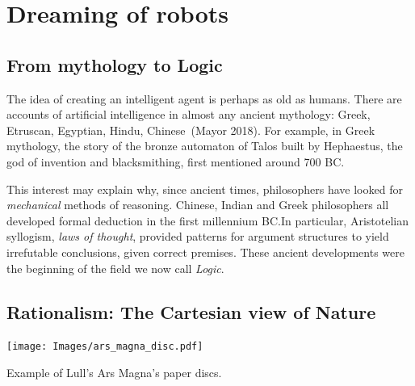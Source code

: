 \documentclass[
  letterpaper,
  12pt,
  british]{tufte-book}
\theoremstyle{plain}
\theoremstyle{plain}
\theoremstyle{definition}
\theoremstyle{remark}
\begin{document}
\hypertarget{dreaming-of-robots}{%
\section{Dreaming of robots}\label{dreaming-of-robots}}

\hypertarget{from-mythology-to-logic}{%
\subsection{From mythology to Logic}\label{from-mythology-to-logic}}

The idea of creating an intelligent agent is perhaps as old as humans.
There are accounts of artificial intelligence in almost any ancient
mythology: Greek, Etruscan, Egyptian, Hindu, Chinese~(Mayor
2018).
For example, in Greek mythology, the story of the bronze automaton of
Talos built by Hephaestus, the god of invention and blacksmithing, first
mentioned around 700 BC.

This interest may explain why, since ancient times, philosophers have
looked for \emph{mechanical} methods of reasoning. Chinese, Indian and
Greek philosophers all developed formal deduction in the first
millennium BC.In particular, Aristotelian syllogism, \emph{laws of
thought}, provided patterns for argument structures to yield irrefutable
conclusions, given correct premises. These ancient developments were the
beginning of the field we now call \emph{Logic}.

\hypertarget{sec-rationalism}{%
\subsection{Rationalism: The Cartesian view of
Nature}\label{sec-rationalism}}

\begin{marginfigure}

{\centering \texttt{[image: Images/ars\_magna\_disc.pdf]}

}

\end{marginfigure}

Example of Lull's Ars Magna's paper discs.
\end{document}
